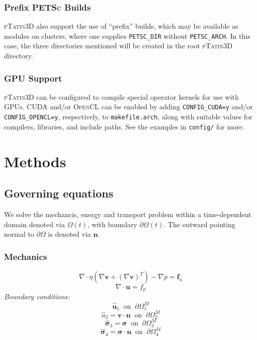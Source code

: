 \documentclass[paper=a4, fontsize=10pt,twoside]{scrartcl}
\newcommand{\ptat}{{{\textsc{pTatin3D}}}}
\newcommand{\PETSc}{{{\textsc{PETSc}}}}
\newcommand{\CUDA}{{{\textsc{CUDA}}}}
\newcommand{\OpenCL}{{{\textsc{OpenCL}}}}
\newcommand{\unix}[1]{\texttt{\footnotesize #1}}
\begin{document}
\subsubsection{Prefix \PETSc{} Builds}
\ptat{} also support the use of ``prefix'' builds, which may be available as modules on clusters, where one supplies \unix{PETSC\_DIR} without \unix{PETSC\_ARCH}. In this case, the three directories mentioned will be created in the root \ptat{} directory.

\subsubsection{GPU Support}
\label{sec:gpusupport}
\ptat{} can be configured to compile special operator kernels for use with GPUs. \CUDA{} and/or \OpenCL{} can be enabled by adding \lstinline{CONFIG_CUDA=y} and/or \lstinline{CONFIG_OPENCL=y}, respectively, to \texttt{makefile.arch}, along with suitable values for compilers, libraries, and include paths.
See the examples in \texttt{config/} for more.

\section{Methods}

\subsection{Governing equations}

We solve the mechancis, energy and transport problem within a time-dependent domain
denoted via $\Omega(t)$, with boundary $\partial \Omega(t)$.
The outward pointing normal to $\partial \Omega$ is denoted via $\boldsymbol n$.

\subsubsection*{Mechanics}
$$
	\nabla \cdot \eta \left( \nabla \boldsymbol v + (\nabla \boldsymbol v)^T \right) - \nabla p = \boldsymbol f_u
$$
$$
	\nabla \cdot \boldsymbol u = f_p
$$
\textit{Boundary conditions:}
$$
	\hat{\boldsymbol u}_1 \medspace \text{ on } \medspace \partial \Omega^M_1
$$
$$
	\hat{u}_2 = \boldsymbol v \cdot \boldsymbol n \medspace \text{ on } \medspace \partial \Omega^M_2
$$
$$
	\hat{\boldsymbol \sigma}_3 = \boldsymbol \sigma \medspace \text{ on } \medspace \partial \Omega^M_3
$$
$$
	\hat{\boldsymbol \sigma}_4 = \boldsymbol \sigma \cdot \boldsymbol n \medspace \text{ on } \medspace \partial \Omega^M_4
$$
\end{document}
